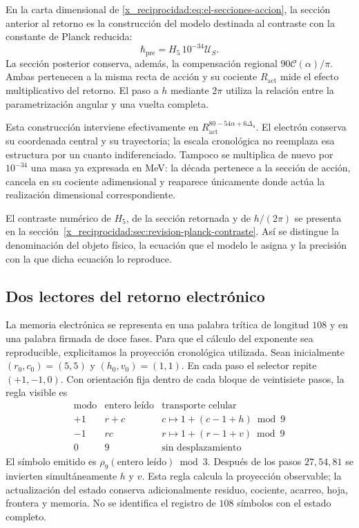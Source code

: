 En la carta dimensional de \eqref{x_reciprocidad:eq:el-secciones-accion}, la sección
anterior al retorno es la construcción del modelo destinada al contraste
con la constante de Planck reducida:
\[
 \hbar_{\mathrm{pre}}=H_5\,10^{-34}\mathcal U_S.
\]
La sección posterior conserva, además, la compensación regional
\(90\mathscr C(\alpha)/\pi\). Ambas pertenecen a la misma recta de
acción y su cociente \(R_{\mathrm{act}}\) mide el efecto multiplicativo
del retorno. El paso a \(h\) mediante \(2\pi\) utiliza la relación
entre la parametrización angular y una vuelta completa.

Esta construcción interviene efectivamente en
\(R_{\mathrm{act}}^{80-54\alpha+6\Delta_4}\). El electrón conserva
su coordenada central y su trayectoria; la escala cronológica no
reemplaza esa estructura por un cuanto indiferenciado. Tampoco se
multiplica de nuevo por \(10^{-34}\) una masa ya expresada en MeV:
la década pertenece a la sección de acción, cancela en su cociente
adimensional y reaparece únicamente donde actúa la realización
dimensional correspondiente.

El contraste numérico de \(H_5\), de la sección retornada y de
\(h/(2\pi)\) se presenta en la sección~\ref{x_reciprocidad:sec:revision-planck-contraste}.
Así se distingue la denominación del objeto físico, la ecuación que el
modelo le asigna y la precisión con la que dicha ecuación lo reproduce.



\subsection{Dos lectores del retorno electrónico}

La memoria electrónica se representa en una palabra trítica de longitud
\(108\) y en una palabra firmada de doce fases. Para que el cálculo del
exponente sea reproducible, explicitamos la proyección cronológica
utilizada. Sean inicialmente
\((r_0,c_0)=(5,5)\) y \((h_0,v_0)=(1,1)\). En cada paso el selector
repite \((+1,-1,0)\). Con orientación fija dentro de cada bloque de
veintisiete pasos, la regla visible es
\[
 \begin{array}{c|c|c}
 \text{modo}&\text{entero leído}&\text{transporte celular}\\\hline
 +1&r+c&c\mapsto1+(c-1+h)\bmod9\\
 -1&rc&r\mapsto1+(r-1+v)\bmod9\\
 0&9&\text{sin desplazamiento}
 \end{array}
\]
El símbolo emitido es \(\rho_9(\text{entero leído})\bmod3\).
Después de los pasos \(27,54,81\) se invierten simultáneamente
\(h\) y \(v\). Esta regla calcula la proyección observable; la
actualización del estado conserva adicionalmente residuo, cociente,
acarreo, hoja, frontera y memoria. No se identifica el registro de
\(108\) símbolos con el estado completo.

